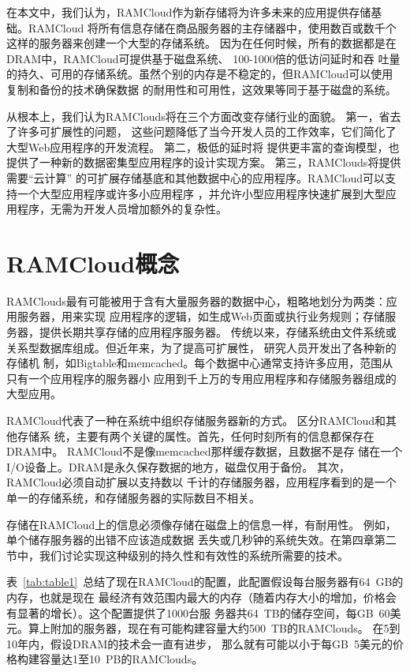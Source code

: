 \documentclass[translation]{zjutreport}
\begin{document}
在本文中，我们认为，RAMCloud作为新存储将为许多未来的应用提供存储基础。RAMCloud
将所有信息存储在商品服务器的主存储器中，使用数百或数千个这样的服务器来创建一个大型的存储系统。
因为在任何时候，所有的数据都是在DRAM中，RAMCloud可提供基于磁盘系统、
100-1000倍的低访问延时和吞
吐量的持久、可用的存储系统。虽然个别的内存是不稳定的，但RAMCloud可以使用复制和备份的技术确保数据
的耐用性和可用性，这效果等同于基于磁盘的系统。

从根本上，我们认为RAMClouds将在三个方面改变存储行业的面貌。
第一，省去了许多可扩展性的问题，
这些问题降低了当今开发人员的工作效率，它们简化了大型Web应用程序的开发流程。
第二，极低的延时将
提供更丰富的查询模型，也提供了一种新的数据密集型应用程序的设计实现方案。
第三，RAMClouds将提供需要“云计算”
的可扩展存储基底和其他数据中心的应用程序。RAMCloud可以支持一个大型应用程序或许多小应用程序
，并允许小型应用程序快速扩展到大型应用程序，无需为开发人员增加额外的复杂性。


\chapter{RAMCloud概念}
RAMClouds最有可能被用于含有大量服务器的数据中心，粗略地划分为两类：应用服务器，用来实现
应用程序的逻辑，如生成Web页面或执行业务规则；存储服务器，提供长期共享存储的应用程序服务器。
传统以来，存储系统由文件系统或关系型数据库组成。但近年来，为了提高可扩展性，
研究人员开发出了各种新的存储机
制，如Bigtable和memcached。每个数据中心通常支持许多应用，范围从只有一个应用程序的服务器小
应用到千上万的专用应用程序和存储服务器组成的大型应用。

RAMCloud代表了一种在系统中组织存储服务器新的方式。
区分RAMCloud和其他存储系
统，主要有两个关键的属性。首先，任何时刻所有的信息都保存在DRAM中。
RAMCloud不是像memcached那样缓存数据，且数据不是存
储在一个I/O设备上。DRAM是永久保存数据的地方，磁盘仅用于备份。
其次，RAMCloud必须自动扩展以支持数以
千计的存储服务器，应用程序看到的是一个单一的存储系统，和存储服务器的实际数目不相关。

存储在RAMCloud上的信息必须像存储在磁盘上的信息一样，有耐用性。
例如，单个储存服务器的出错不应该造成数据
丢失或几秒钟的系统失效。在第四章第二节中，我们讨论实现这种级别的持久性和有效性的系统所需要的技术。

表~\ref{tab:table1}~总结了现在RAMCloud的配置，此配置假设每台服务器有64~GB的内存，也就是现在
最经济有效范围内最大的内存（随着内存大小的增加，价格会有显著的增长）。这个配置提供了1000台服
务器共64~TB的储存空间，每GB~60美元。算上附加的服务器，现在有可能构建容量大约500~TB的RAMClouds。
在5到10年内，假设DRAM的技术会一直有进步，
那么就有可能以小于每GB~5美元的价格构建容量达1至10~PB的RAMClouds。
\end{document}
